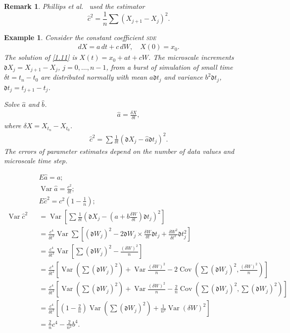 \documentclass[12pt,reqno, a4paper]{article}
\newtheorem{example}[theorem]{Example}
\numberwithin{equation}{section}
\newtheorem{remark}[theorem]{Remark}
\begin{document}
   \begin{remark}
Phillips et al.~\cite{Pe} used the  estimator
   $$\hat{c}^2=\frac 1 n\sum (X_{j+1}-X_{j})^2.$$
 \end{remark}
\begin{example}
Consider the constant coefficient \textsc{sde}
\begin{eqnarray}
dX=a\, dt+c\, dW,   \quad  X(0)=x_0. \label{1.11}
\end{eqnarray}
The solution of  \eqref{1.11} is $X(t)=x_0+at+cW$. The microscale increments $\mathfrak{d} X_j= X_{j+1}- X_{j}$, $j=0, \ldots, n-1$, from a burst of simulation of small time $\delta t=t_n-t_0$  are distributed normally with mean $a\mathfrak{d}  t_j$ and variance $b^2\mathfrak{d} t_j$, $\mathfrak{d} t_j=t_{j+1}-t_j$.

Solve $\hat{a}$ and $\hat{b}$.
\begin{eqnarray}\label{ex1}\hat{a}=\frac {\delta X}{\delta t},\end{eqnarray}
where $\delta X=X_{t_{n}}-X_{t_0}$.
\begin{eqnarray}\label{ex2}\hat{c}^2=\sum\frac 1 {\delta t}(\mathfrak{d} X_j-\hat{a}\mathfrak{d} t_j)^2.
\end{eqnarray}
The errors of parameter estimates  depend on the number of data values and microscale time step.

\begin{eqnarray*}&&E\hat{a}=a; \\&&\operatorname{Var} \hat{a}=\frac { c^2}{\delta t};\\&&E\hat{c}^2=
{ c^2 (1-\frac 1 n)};\\
\operatorname{Var} \hat{c}^2&&=\operatorname{Var}\left[\sum \frac {1} {\delta t}(\mathfrak{d} X_j-(a+b\frac {\delta W}{\delta t})\mathfrak{d} t_j)^2\right]\\&&= \frac {c^4}{{\delta t}^2}\operatorname{Var}\sum\left[(\mathfrak{d} W_j)^2-2\mathfrak{d} W_j\times \frac{\delta W}{\delta t}\mathfrak{d} t_j+ \frac{{\delta W}^2}{{\delta t}^2}\mathfrak{d} t_j^2\right]\\&&= \frac {c^4}{{\delta t}^2}\operatorname{Var}\left[\sum( \mathfrak{d} W_j)^2-\frac {(\delta W)^2 }{n }\right]\\&&= \frac {c^4}{{\delta t}^2}\left[\operatorname{Var}(\sum( \mathfrak{d} W_j)^2)+\operatorname{Var}{\frac {(\delta W)^2 }{n }}-2\operatorname{Cov}(\sum( \mathfrak{d} W_j)^2,\frac {(\delta W)^2 }{n })\right]\\&&= \frac {c^4}{{\delta t}^2}\left[\operatorname{Var}(\sum( \mathfrak{d} W_j)^2)+\operatorname{Var}{\frac {(\delta W)^2 }{n }}-\frac 2 n \operatorname{Cov}(\sum( \mathfrak{d} W_j)^2,  \sum( \mathfrak{d} W_j)^2)\right]\\&&= \frac {c^4}{{\delta t}^2}\left[(1-\frac 2 n)\operatorname{Var}(\sum( \mathfrak{d} W_j)^2)+\frac 1 {n^2}\operatorname{Var}{{(\delta W)^2 }{ }}\right]\\\
&&=\frac {2}{n} c^4 - \frac {2}{n^2 }b^4.
\end{eqnarray*}
\end{example}
\end{document}
